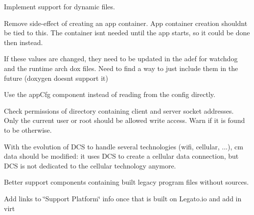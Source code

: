 
\begin{DoxyRefList}
\item[\label{todo__todo000008}%
\hypertarget{todo__todo000008}{}%
File \hyperlink{supervisor_2app_8c}{app.c} ]Implement support for dynamic files. 
\item[\label{todo__todo000010}%
\hypertarget{todo__todo000010}{}%
Global \hyperlink{apps_8c_afdce3eea2d425a1f8ff2ebac5c46215c}{app\+Ctrl\+\_\+\+Get\+Ref} (const char $\ast$app\+Name)]Remove side-\/effect of creating an app container. App container creation shouldn\textquotesingle{}t be tied to this. The container isn\textquotesingle{}t needed until the app starts, so it could be done then instead.  
\item[\label{todo__todo000018}%
\hypertarget{todo__todo000018}{}%
Page \hyperlink{defFilesAdef}{Application Definition .adef} ]If these values are changed, they need to be updated in the adef for watchdog and the runtime arch dox files. Need to find a way to just include them in the future (doxygen doesn\textquotesingle{}t support it) 
\item[\label{todo__todo000056}%
\hypertarget{todo__todo000056}{}%
Global \hyperlink{app_ctrl_8c_ad9d8a245fff7a1b56a68019946c6e083}{App\+Name\+Ptr} ]Use the app\+Cfg component instead of reading from the config directly.  
\item[\label{todo__todo000007}%
\hypertarget{todo__todo000007}{}%
Global \hyperlink{service_directory_8c_ae3332aebea89372dcc9eec8fbd864de0}{Client\+Socket\+Fd} ]Check permissions of directory containing client and server socket addresses. Only the current user or root should be allowed write access. Warn if it is found to be otherwise.  
\item[\label{todo__todo000019}%
\hypertarget{todo__todo000019}{}%
Page \hyperlink{toolsTarget_cm}{cm} ]With the evolution of D\+CS to handle several technologies (wifi, cellular, ...), {\ttfamily  cm data } should be modified\+: it uses D\+CS to create a cellular data connection, but D\+CS is not dedicated to the cellular technology anymore. 
\item[\label{todo__todo000015}%
\hypertarget{todo__todo000015}{}%
Page \hyperlink{conceptsComponents}{Components} ]Better support components containing built legacy program files without sources. 
\item[\label{todo__todo000014}%
\hypertarget{todo__todo000014}{}%
Page \hyperlink{basicBuildMake}{Configure the Application Framework} ]Add links to \char`\"{}\+Support Platform\char`\"{} info once that is built on Legato.\+io and add in virt 

\end{DoxyRefList}
